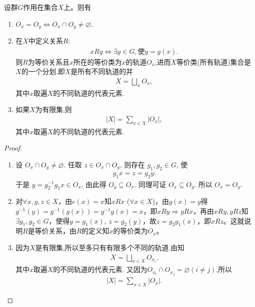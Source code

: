 \documentclass[../../main.tex]{subfiles}%
\begin{document}
\begin{theorem}\label{theorem:抽象代数--定理4.2.2}
设群$G$作用在集合$X$上。则有
\begin{enumerate}[(1)]
\item\label{theorem:抽象代数--定理4.2.2-0} $O_x=O_y\iff O_x\cap O_y\neq \varnothing .$

\item\label{theorem:抽象代数--定理4.2.2-1} 在$X$中定义关系$R$:
\begin{align*}
xRy\iff \exists g \in G, \text{使}y = g(x).
\end{align*}
则$R$为等价关系且$x$所在的等价类为$x$的轨道$O_x$,进而$X$等价类(所有轨道)集合是$X$的一个分划.即$X$是所有不同轨道的并
\begin{align*}
X=\bigsqcup_x O_x,
\end{align*}
其中$x$取遍$X$的不同轨道的代表元素.

\item\label{theorem:抽象代数--定理4.2.2-2} 如果$X$为有限集,则
\begin{align*}
|X|=\sum_{x\in X}|O_{x}|,
\end{align*}
其中$x$取遍$X$的不同轨道的代表元素.
\end{enumerate}
\end{theorem}
\begin{proof}
\begin{enumerate}[(1)]
\item 设 $O_x \cap O_y \neq \varnothing$. 任取 $z \in O_x \cap O_y$, 则存在 $g_1,g_2 \in G$, 使
\begin{align*}
g_1x = z = g_2y.
\end{align*}
于是 $y = g_2^{-1}g_1x \in O_x$, 由此得 $O_y \subseteq O_x$. 同理可证 $O_x \subseteq O_y$. 所以 $O_x = O_y$.


\item 对$\forall x, y, z \in X$，由$e(x) = x$知$xRx$ ($\forall x \in X$)，由$g(x) = y$得$g^{-1}(y) = g^{-1}(g(x)) =g^{-1}g(x)= x$，即$xRy \Rightarrow yRx$，再由$xRy, yRz$知$\exists g_1, g_2 \in G$，使得$y = g_1(x)$, $z = g_2(y)$，故$z = g_2g_1(x)$，即$xRz$。这就说明$R$是等价关系，由$R$的定义知$x$的等价类为$O_x$。

\item 因为$X$是有限集,所以至多只有有限多个不同的轨道.由知
\begin{align*}
X = \bigsqcup_{x\in X}O_{x_i}.
\end{align*}
其中$x$取遍$X$的不同轨道的代表元素.
又因为$O_{x_i}\cap O_{x_j}=\varnothing (i\neq j)$,所以
\begin{align*}
|X|=\sum_{x\in X}|O_{x}|.
\end{align*}
\end{enumerate}
\end{proof}
\end{document}
